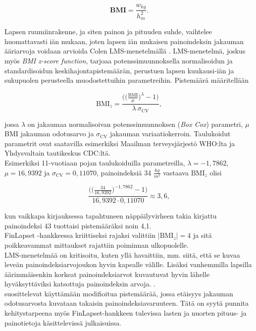 \documentclass[finnish]{docopts}
\begin{document}
$$
\textbf{BMI} = \frac{w_{kg}}{h_{m}^2}.
$$

Lapsen ruumiinrakenne, ja siten painon ja pituuden suhde, vaihtelee huomattavasti iän mukaan, joten lapsen iän mukaisen painoindeksin jakauman ääriarvoja voidaan arvioida Colen LMS-menetelmällä \citep{cole90}. LMS-menetelmä, joskus myös \textit{BMI z-score function}, tarjoaa potenssimuunnoksella normalisoidun ja standardisoidun keskihajontapistemäärän, perustuen lapsen kuukausi-iän ja sukupuolen perusteella muodostettuihin parametreihin. Pistemäärä määritellään

$$
\text{BMI}_z = \frac{\bigg( \big( \frac{\text{BMI}}{\mu}\big)^\lambda - 1 \bigg)}{\lambda \ \sigma_{\text{CV}}},
$$

jossa $\lambda$ on jakaumaa normalisoivan potenssimuunnoksen (\textit{Box Cox}) parametri, $\mu$ BMI jakauman odotusarvo ja $\sigma_{\text{CV}}$ jakauman variaatiokerroin. Taulukoidut parametrit ovat saatavilla esimerkiksi Maailman terveysjärjestö WHO:lta ja Yhdysvaltain tautikeskus CDC:ltä.\\

Esimerkiksi 11-vuotiaan pojan taulukoiduilla parametreilla, $\lambda = -1,7862$, $\mu = 16,9392$ ja $\sigma_{\text{CV}} = 0,11070$, painoindeksiä 34 $\frac{kg}{m^2}$ vastaava $\text{BMI}_z$ olisi

$$
\frac{\bigg( \big( \frac{34}{16,9392}\big)^{-1,7862} - 1 \bigg)}{16,9392 \cdot 0,11070} \approx 3,6,
$$

kun vaikkapa kirjauksessa tapahtuneen näppäilyvirheen takia kirjattu painoindeksi 43 tuottaisi pistemääräksi noin 4,1.\\

FinLapset -hankkeessa kriittiseksi rajaksi valittiin $|\text{BMI}_z| = 4$ ja sitä poikkeavammat mittaukset rajattiin poiminnan ulkopuolelle.\\

LMS-menetelmää on kritisoitu, kuten yllä havaittiin, mm. siitä, että se kuvaa leveän painoindeksiarvojoukon hyvin kapealle välille. Lisäksi vanhemmilla lapsilla äärimmäisenkin korkeat painoindeksiarvot kuvautuvat hyvin lähelle hyväksyttäviksi katsottuja painoindeksin arvoja. \citep{flegal13, cdc13}. \\

\cite{flegal13} suosittelevat käyttämään modifioitua pistemäärää, jossa etäisyys jakauman odotusarvosta kuvataan takaisin painoindeksiavaruuteen. Tätä on syytä punnita kehitystarpeena myös FinLapset-hankkeen tulevissa lasten ja nuorten pituus- ja painotietoja käsittelevissä julkaisuissa. \\
\end{document}
